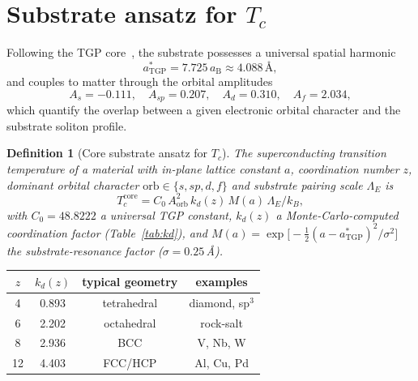 \documentclass[11pt,a4paper]{article}
\newcommand{\LamE}{\Lambda_{E}}
\newtheorem{definition}[theorem]{Definition}
\begin{document}
\section{Substrate ansatz for \texorpdfstring{$T_{c}$}{Tc}}\label{sec:substrate-ansatz}

Following the TGP core~\cite{TGP-core}, the substrate possesses a
universal spatial harmonic
\begin{equation}\label{eq:astgp}
  a^{\ast}_{\mathrm{TGP}} = 7.725\,a_{\mathrm{B}}
  \approx 4.088\,\text{\AA},
\end{equation}
and couples to matter through the orbital amplitudes
\begin{equation}\label{eq:A-orb}
  A_{s} = -0.111,\quad
  A_{sp} = 0.207,\quad
  A_{d} = 0.310,\quad
  A_{f} = 2.034,
\end{equation}
which quantify the overlap between a given electronic orbital character
and the substrate soliton profile.

\begin{definition}[Core substrate ansatz for $T_{c}$]\label{def:ansatz}
The superconducting transition temperature of a material with in-plane
lattice constant $a$, coordination number $z$, dominant orbital character
$\mathrm{orb}\in\{s,sp,d,f\}$ and substrate pairing scale
$\LamE$ is
\begin{equation}\label{eq:ansatz}
  \boxed{\;
    T_{c}^{\mathrm{core}}
    = C_{0}\,A_{\mathrm{orb}}^{2}\,k_{d}(z)\,M(a)\,\LamE/k_{B},
  \;}
\end{equation}
with $C_{0}=48.8222$ a universal TGP constant,
$k_{d}(z)$ a Monte-Carlo-computed coordination factor
(Table~\ref{tab:kd}), and
$M(a)=\exp\!\bigl[-\tfrac{1}{2}(a-a^{\ast}_{\mathrm{TGP}})^{2}/\sigma^{2}\bigr]$
the substrate-resonance factor ($\sigma=0.25$\,\AA).
\end{definition}

\begin{center}\small
{}\label{tab:kd}
\begin{tabular}{@{}cccc@{}}
\toprule
$z$ & $k_{d}(z)$ & typical geometry & examples\\
\midrule
4  & 0.893 & tetrahedral & diamond, sp$^{3}$\\
6  & 2.202 & octahedral  & rock-salt\\
8  & 2.936 & BCC         & V, Nb, W\\
12 & 4.403 & FCC/HCP     & Al, Cu, Pd\\
\bottomrule
\end{tabular}
\end{center}
\end{document}
